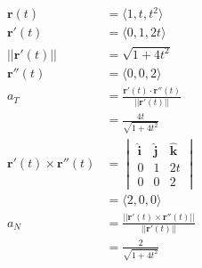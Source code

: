 \documentclass{article}
\begin{document}
\setcounter{subsubsection}{6}
\subsubsection{}

\begin{align*}
  \mathbf{r}(t)                         & = \langle 1, t, t^2 \rangle                                                                        \\
  \mathbf{r}'(t)                        & = \langle 0, 1, 2 t \rangle                                                                        \\
  ||\mathbf{r}'(t)||                    & = \sqrt{1 + 4 t^2}                                                                                 \\
  \mathbf{r}''(t)                       & = \langle 0, 0, 2 \rangle                                                                          \\
  a_T                                   & = \frac{\mathbf{r}'(t) \cdot \mathbf{r}''(t)}{||\mathbf{r}'(t)||}                                  \\
                                        & = \frac{4 t}{\sqrt{1 + 4 t^2}}                                                                     \\
  \mathbf{r}'(t) \times \mathbf{r}''(t) & = \begin{vmatrix}
                                              \hat{\mathbf{i}} & \hat{\mathbf{j}} & \hat{\mathbf{k}} \\
                                              0                & 1                & 2 t              \\
                                              0                & 0                & 2
                                            \end{vmatrix} \\
                                        & = \langle 2, 0, 0 \rangle                                                                          \\
  a_N                                   & = \frac{||\mathbf{r}'(t) \times \mathbf{r}''(t)||}{||\mathbf{r}'(t)||}                             \\
                                        & = \frac{2}{\sqrt{1 + 4 t^2}}
\end{align*}

\setcounter{subsubsection}{16}
\subsubsection{}
\end{document}
